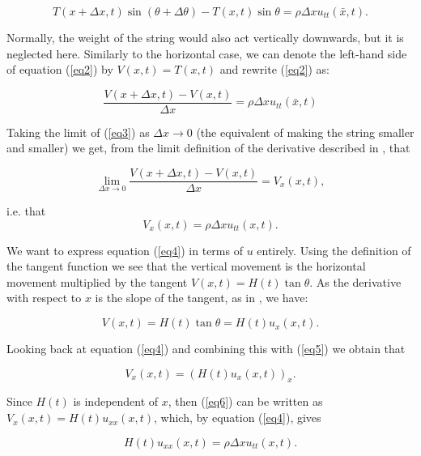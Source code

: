 \documentclass[a4paper, 12pt]{article}
\numberwithin{equation}{section}
\begin{document}
 \begin{equation} \label{eq2}
    T(x+\Delta x,t)\sin{(\theta + \Delta \theta)}-T(x,t)\sin{\theta}=\rho\Delta x u_{tt} (\bar{x},t).
 \end{equation}

 Normally, the weight of the string would also act vertically downwards, but it is neglected here. Similarly to the 
 horizontal case, we can denote the left-hand side of equation (\ref{eq2}) by $V(x,t)=T(x,t)$ and rewrite (\ref{eq2})
 as:

 \begin{equation} \label{eq3}
    \frac{V(x+\Delta x,t)-V(x,t)}{\Delta x}=\rho\Delta x u_{tt} (\bar{x},t)
 \end{equation}

 Taking the limit of (\ref{eq3}) as $\Delta x \rightarrow 0$ (the equivalent of making the string smaller and smaller)
 we get, from the limit definition of the derivative described in \cite{Spi}, that 

 \begin{equation*}
    \lim_{\Delta x \rightarrow 0}\frac{V(x+\Delta x,t)-V(x,t)}{\Delta x}=V_x(x,t),
 \end{equation*}

i.e. that 
\begin {equation} \label{eq4}
    V_x(x,t)=\rho\Delta x u_{tt} (x,t).
\end{equation}

We want to express equation (\ref{eq4}) in terms of $u$ entirely. Using the definition of the tangent function we see that the vertical movement is the
horizontal movement multiplied by the tangent $V(x, t)=H(t)\tan{\theta}$. As the derivative with respect to $x$ is the slope of
the tangent, as in \cite{Spi}, we have:

\begin{equation} \label{eq5}
    V(x,t)=H(t)\tan{\theta}=H(t)u_x(x,t).
\end{equation}

Looking back at equation (\ref{eq4}) and combining this with (\ref{eq5}) we obtain that

\begin{equation} \label{eq6}
    V_x(x,t)=(H(t)u_x(x,t))_x.
\end{equation}

Since $H(t)$ is independent of $x$, then (\ref{eq6}) can be written as $V_x(x,t)=H(t)u_{xx}(x,t)$, which, by equation (\ref{eq4}), 
gives

\begin {equation} \label{eq7}
    H(t)u_{xx}(x, t)=\rho\Delta x u_{tt}(x,t).
\end{equation}
\end{document}
